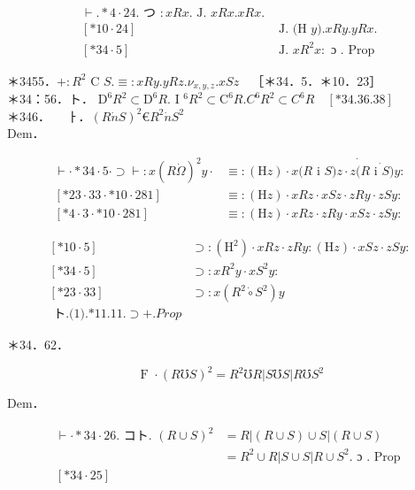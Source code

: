 \documentclass[10pt]{article}
\begin{document}
$$
\begin{array}{ll}
\vdash . * 4 \cdot 24 . \text { つ }: x R x . \text { J. } x R x . x R x . \\
{[* 10 \cdot 24]} & \text { J. (H } y) . x R y . y R x . \\
{[* 34 \cdot 5]} & \text { J. } x R^{2} x: \text { ɔ } . \text { Prop }
\end{array}
$$

＊3455．$+: R^{2}$ C $S . \equiv: x R y . y R z . \nu_{x, y, z} . x S z \quad$［＊34．5．＊10．23］\\
＊34：56．ト． $\mathrm{D}^{6} R^{2} \subset \mathrm{D}^{6} R$. I ${ }^{6} R^{2} \subset \mathrm{C}^{6} R . C^{6} R^{2} \subset C^{6} R \quad[* 34.36 .38]$\\
＊346．$\quad$ ㅏ．$(R \dot{n} S)^{2} € R^{2} \dot{n} S^{2}$\\
Dem．

$$
\begin{array}{ll}
\vdash \cdot * 34 \cdot 5 \cdot \supset \vdash: x(R \dot{\Omega})^{2} y \cdot & \equiv:(\mathrm{H} z) \cdot x(R \dot{\text { i } S) z \cdot z(R \dot{\text { i } S)} y:} \\
{[* 23 \cdot 33 \cdot * 10 \cdot 281]} & \equiv:(\mathrm{H} z) \cdot x R z \cdot x S z \cdot z R y \cdot z S y: \\
{[* 4 \cdot 3 \cdot * 10 \cdot 281]} & \equiv:(\mathrm{H} z) \cdot x R z \cdot z R y \cdot x S z \cdot z S y:
\end{array}
$$

\[
\begin{array}{ll}
{[* 10 \cdot 5]} & \supset:\left(\mathrm{H}^{2}\right) \cdot x R z \cdot z R y:(\mathrm{H} z) \cdot x S z \cdot z S y: \\
{[* 34 \cdot 5]} & \supset: x R^{2} y \cdot x S^{2} y: \\
{[* 23 \cdot 33]} & \supset: x\left(R^{2} \dot{\circ} S^{2}\right) y  \tag{1}\\
\text { ト.(1).*11.11.} \supset+. P r o p &
\end{array}
\]

＊34．62．

$$
\text { F } \cdot(R \mho S)^{2}=R^{2} \mho R|S \mho S| R \mho S^{2}
$$

Dem．

$$
\begin{aligned}
\vdash \cdot * 34 \cdot 26 . \text { コト. }(R \cup S)^{2} & =R|(R \cup S) \cup S|(R \cup S) \\
& =R^{2} \cup R|S \cup S| R \cup S^{2} . \text { ɔ } . \text { Prop } \\
{[* 34 \cdot 25] } &
\end{aligned}
$$
\end{document}
